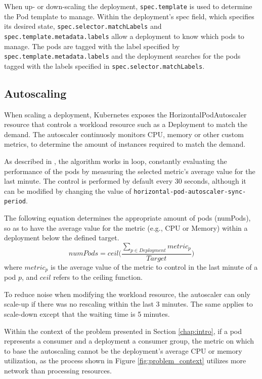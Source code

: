 \begin{sloppypar}
When up- or down-scaling the deployment, \lstinline{spec.template} is used to
determine the Pod template to manage. Within the deployment's spec field, which
specifies its desired state, \lstinline{spec.selector.matchLabels} and
\lstinline{spec.template.metadata.labels} allow a deployment to know
which pods to manage. The pods are tagged with the label specified by
\lstinline{spec.template.metadata.labels} and the deployment searches for the
pods tagged with the labels specified in
\lstinline{spec.selector.matchLabels}.
\end{sloppypar}

\subsection{Autoscaling}

When scaling a deployment, Kubernetes exposes the HorizontalPodAutoscaler
resource that controls a workload resource such as a Deployment to match the
demand. The autoscaler continuosly monitors CPU, memory or other custom metrics,
to determine the amount of instances required to match the demand.

\begin{sloppypar}
As described in \cite{KubernetesAutoscaling}, the algorithm works in loop,
constantly evaluating the performance of the pods by measuring the selected
metric's average value for the last minute. The control is performed by default
every 30 seconds, although it can be modified by changing the value of
\lstinline{horizontal-pod-autoscaler-sync-period}.
\end{sloppypar}

The following equation determines the appropriate amount of pods (numPods), so
as to have the average value for the metric (e.g., CPU or Memory) within a
deployment below the defined target.
\begin{equation}
    numPods = ceil\bigg(\frac
        {\sum_{p \in Deployment} metric_p}
        {Target}
    \bigg)
\end{equation}
where $metric_p$ is the average value of the metric to control in the last
minute of a pod $p$, and $ceil$ refers to the ceiling function. 

To reduce noise when modifying the workload resource, the autoscaler can only
scale-up if there was no rescaling within the last 3 minutes. The same applies
to scale-down except that the waiting time is 5 minutes.

Within the context of the problem presented in Section \ref{chap:intro}, if a
pod represents a consumer and a deployment a consumer group, the metric on
which to base the autoscaling cannot be the deployment's average CPU or memory
utilization, as the process shown in Figure \ref{fig:problem_context} utilizes
more network than processing resources. 

